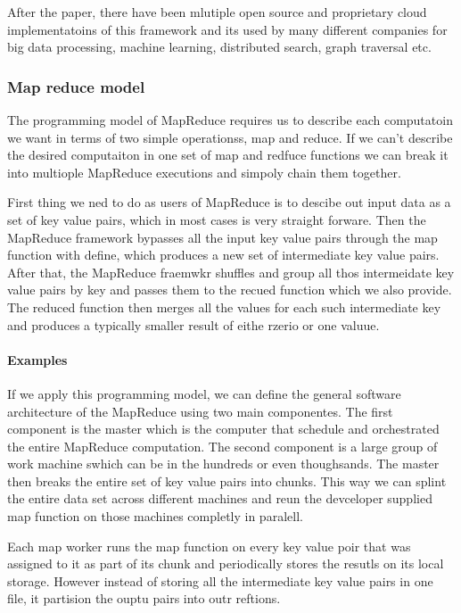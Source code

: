 \documentclass[a4paper, 11pt]{book}
\begin{document}
{    After the paper, there have been mlutiple open source and proprietary cloud implementatoins of this framework and its used by many different companies for big data processing, machine learning, distributed search, graph traversal etc.

    \subsubsection{Map reduce model}
    The programming model of MapReduce requires us to describe each computatoin we want in terms of two simple operationss, map and reduce.
    If we can't describe the desired computaiton in one set of map and redfuce functions we can break it into multiople MapReduce executions and simpoly chain them together.

    First thing we ned to do as users of MapReduce is to descibe out input data as a set of key value pairs, which in most cases is very straight forware.
    Then the MapReduce framework bypasses all the input key value pairs through the map function with define, which produces a new set of intermediate key value pairs.
    After that, the MapReduce fraemwkr shuffles and group all thos intermeidate key value pairs by key and passes them to the recued function which we also provide.
    The reduced function then merges all the values for each such intermediate key and produces a typically smaller result of eithe rzerio or one valuue.

    \paragraph{Examples}

    If we apply this programming model, we can define the general software architecture of the MapReduce using two main componentes.
    The first component is the master which is the computer that schedule and orchestrated the entire MapReduce computation.
    The second component is a large group of work machine swhich can be in the hundreds or even thoughsands.
    The master then breaks the entire set of key value pairs into chunks.
    This way we can splint the entire data set across different machines and reun the devceloper supplied map function on those machines completly in paralell.

    Each map worker runs the map function on every key value poir that was assigned to it as part of its chunk and periodically stores the resutls on its local storage.
    However instead of storing all the intermediate key value pairs in one file, it partision the ouptu pairs into outr reftions.

}
\end{document}
